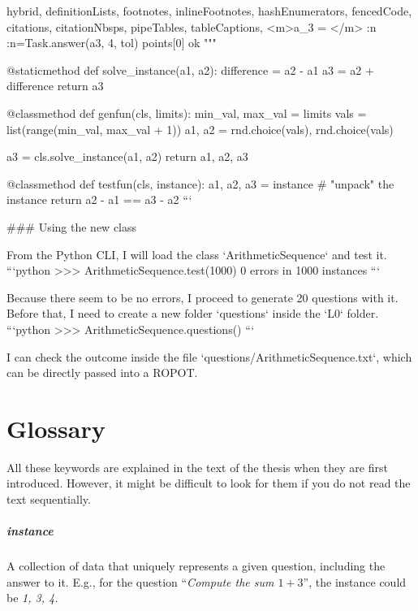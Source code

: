 \documentclass[
  digital, %
  table,   %
  twoside, %
  nolof,     %
  nolot,     %
  draft=false,
  final,
]{fithesis3}
\begin{document}
\begin{markdown*}{%
  hybrid,
  definitionLists,
  footnotes,
  inlineFootnotes,
  hashEnumerators,
  fencedCode,
  citations,
  citationNbsps,
  pipeTables,
  tableCaptions,
}
        <m>a_3 = </m> :n
        :n={Task.answer(a3, 4, tol)} {points[0]} ok
        """
    
    @staticmethod
    def solve_instance(a1, a2):
        difference = a2 - a1
        a3 = a2 + difference
        return a3
    
    @classmethod
    def genfun(cls, limits):
        min_val, max_val = limits
        vals = list(range(min_val, max_val + 1))
        a1, a2 = rnd.choice(vals), rnd.choice(vals)
    
        a3 = cls.solve_instance(a1, a2)
        return a1, a2, a3
    
    @classmethod
    def testfun(cls, instance):
        a1, a2, a3 = instance  # "unpack" the instance
        return a2 - a1 == a3 - a2
```

### Using the new class

From the Python CLI, I will load the class `ArithmeticSequence` and test it.
```python
>>> ArithmeticSequence.test(1000)
0 errors in 1000 instances
```

Because there seem to be no errors, I proceed to generate 20 questions with it.
Before that, I need to create a new folder `questions` inside the `L0` folder.
```python
>>> ArithmeticSequence.questions()
```

I can check the outcome inside the file `questions/ArithmeticSequence.txt`, which
can be directly passed into a ROPOT.

\end{markdown*}
\shorthandon{-}








\chapter{Glossary}

All these keywords are explained in the text of the thesis when they are first introduced. However, it might be difficult to look for them if you do not read the text sequentially.


\paragraph{instance}

A collection of data that uniquely represents a given question, including the answer to it. E.g., for the question ``\textit{Compute the sum $1 + 3$}'', the instance could be \textit{1, 3, 4.}
\end{document}
